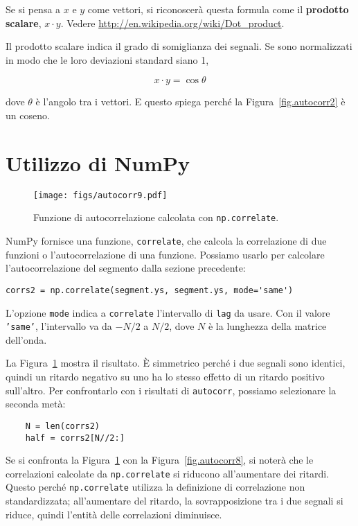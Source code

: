 \documentclass[12pt,a4paper]{book}
\begin{document}
Se si pensa a $x$ e $y$ come vettori, si riconoscerà questa formula come il {\bf prodotto scalare}, $x \cdot y$. Vedere \url{http://en.wikipedia.org/wiki/Dot_product}.

\newcommand{\norm}{\mathrm{norm}}

Il prodotto scalare indica il grado di somiglianza dei segnali. Se sono normalizzati in modo che le loro deviazioni standard siano 1,

%
\[ x \cdot y = \cos \theta \] 

%
dove $\theta$ è l'angolo tra i vettori. E questo spiega perché la Figura~\ref{fig.autocorr2} è un coseno.

\section{Utilizzo di NumPy} \label{correlate} 

\begin{figure} 

\centerline{\texttt{[image: figs/autocorr9.pdf]}} \caption{Funzione di autocorrelazione calcolata con {\tt np.correlate}.} \label{fig.autocorr9} \end{figure} 

NumPy fornisce una funzione, {\tt correlate}, che calcola la correlazione di due funzioni o l'autocorrelazione di una funzione. Possiamo usarlo per calcolare l'autocorrelazione del segmento dalla sezione precedente:

\begin{verbatim} 
corrs2 = np.correlate(segment.ys, segment.ys, mode='same')
 \end{verbatim} 

L'opzione {\tt mode} indica a {\tt correlate} l'intervallo di {\tt lag} da usare. Con il valore {\tt 'same'}, l'intervallo va da $-N/2$ a $N/2$, dove $N$ è la lunghezza della matrice dell'onda.

La Figura~\ref{fig.autocorr9} mostra il risultato. È simmetrico perché i due segnali sono identici, quindi un ritardo negativo su uno ha lo stesso effetto di un ritardo positivo sull'altro. Per confrontarlo con i risultati di {\tt autocorr}, possiamo selezionare la seconda metà:

\begin{verbatim} 
    N = len(corrs2)
    half = corrs2[N//2:]
 \end{verbatim} 

Se si confronta la Figura~\ref{fig.autocorr9} con la Figura~\ref{fig.autocorr8}, si noterà che le correlazioni calcolate da {\tt np.correlate} si riducono all'aumentare dei ritardi. Questo perché {\tt np.correlate} utilizza la definizione di correlazione non standardizzata; all'aumentare del ritardo, la sovrapposizione tra i due segnali si riduce, quindi l'entità delle correlazioni diminuisce.
\end{document}
